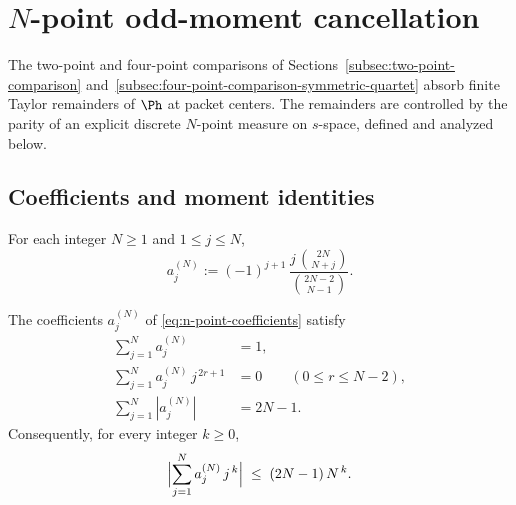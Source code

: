 \section{\texorpdfstring{\(N\)}{N}-point odd-moment cancellation}
\label{sec:n-point-odd-moment-cancellation}
\quad
{}\quad
{}\quad
{}\quad
{}\quad
{}
\par\medskip

The two-point and four-point comparisons of
Sections~\ref{subsec:two-point-comparison}
and~\ref{subsec:four-point-comparison-symmetric-quartet} absorb finite
Taylor remainders of \(\Ph\) at packet centers.  The remainders are
controlled by the parity of an explicit discrete \(N\)-point measure
on \(s\)-space, defined and analyzed below.

\subsection{Coefficients and moment identities}
\label{subsec:n-point-coefficients}

\begin{definition}
\label{def:n-point-coefficients}
For each integer \(N\ge 1\) and \(1\le j\le N\),
\begin{equation}
\label{eq:n-point-coefficients}
        a_j^{(N)}
        :=
        (-1)^{j+1}\,
        \frac{j\,\binom{2N}{N+j}}{\binom{2N-2}{N-1}}.
\end{equation}
\end{definition}

\begin{lemma}
\label{lem:n-point-coefficients}
The coefficients \(a_j^{(N)}\) of \eqref{eq:n-point-coefficients} satisfy
\begin{align}
\label{eq:n-point-normalization}
        \sum_{j=1}^N a_j^{(N)}
        &= 1,\\
\label{eq:n-point-odd-moments-vanish}
        \sum_{j=1}^N a_j^{(N)}\, j^{\,2r+1}
        &= 0
        \qquad (0\le r\le N-2),\\
\label{eq:n-point-ell1}
        \sum_{j=1}^N |a_j^{(N)}|
        &= 2N - 1.
\end{align}
Consequently, for every integer \(k\ge 0\),
\begin{equation}
\label{eq:n-point-moment-bound}
        \Bigl|\sum_{j=1}^N a_j^{(N)}\, j^{\,k}\Bigr|
        \;\le\;
        (2N-1)\,N^{\,k}.
\end{equation}
\end{lemma}

